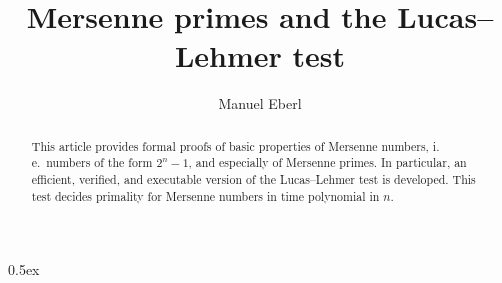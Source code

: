 \documentclass[11pt,a4paper]{article}
\begin{document}
\title{Mersenne primes and the Lucas--Lehmer test}
\author{Manuel Eberl}
\maketitle

\begin{abstract}
This article provides formal proofs of basic properties of Mersenne numbers, i.\,e.\ numbers of the form $2^n - 1$, and especially of Mersenne primes.
In particular, an efficient, verified, and executable version of the Lucas--Lehmer test is developed. This test decides primality for Mersenne numbers in
time polynomial in $n$.
\end{abstract}

\tableofcontents
\newpage
\parindent 0pt\parskip 0.5ex





\end{document}
